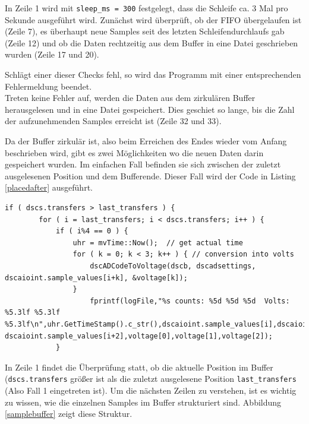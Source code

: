 \documentclass[12pt,a4paper]{scrartcl}
\begin{document}
In Zeile 1 wird mit \texttt{sleep\_ms = 300} festgelegt, dass die Schleife ca. 3 Mal pro Sekunde ausgeführt wird. Zunächst wird überprüft, ob der FIFO übergelaufen ist (Zeile 7), es überhaupt neue Samples seit des letzten Schleifendurchlaufs gab (Zeile 12) und ob die Daten rechtzeitig aus dem Buffer in eine Datei geschrieben wurden (Zeile 17 und 20). 

Schlägt einer dieser Checks fehl, so wird das Programm mit einer entsprechenden Fehlermeldung beendet.\\

Treten keine Fehler auf, werden die Daten aus dem zirkulären Buffer herausgelesen und in eine Datei gespeichert.
Dies geschiet so lange, bis die Zahl der aufzunehmenden Samples erreicht ist (Zeile 32 und 33).

Da der Buffer zirkulär ist, also beim Erreichen des Endes wieder vom Anfang beschrieben wird, gibt es zwei Möglichkeiten wo die neuen Daten darin gespeichert wurden. Im einfachen Fall befinden sie sich zwischen der zuletzt ausgelesenen Position und dem Bufferende. Dieser Fall wird der Code in Listing \ref{placedafter} ausgeführt. 

\begin{lstlisting}[frame=trBL]
	if ( dscs.transfers > last_transfers ) {
		for ( i = last_transfers; i < dscs.transfers; i++ ) {
			if ( i%4 == 0 ) {
				uhr = mvTime::Now();  // get actual time
				for ( k = 0; k < 3; k++ ) { // conversion into volts
					dscADCodeToVoltage(dscb, dscadsettings, dscaioint.sample_values[i+k], &voltage[k]);
				}
					fprintf(logFile,"%s counts: %5d %5d %5d  Volts: %5.3lf %5.3lf %5.3lf\n",uhr.GetTimeStamp().c_str(),dscaioint.sample_values[i],dscaioint.sample_values[i+1], dscaioint.sample_values[i+2],voltage[0],voltage[1],voltage[2]);
			}
\end{lstlisting}		

In Zeile 1 findet die Überprüfung statt, ob die aktuelle Position im Buffer (\texttt{dscs.transfers} größer ist als die zuletzt ausgelesene Position \texttt{last\_transfers} (Also Fall 1 eingetreten ist). 
Um die nächsten Zeilen zu verstehen, ist es wichtig zu wissen, wie die einzelnen Samples im Buffer strukturiert sind. Abbildung \ref{samplebuffer} zeigt diese Struktur. 
\end{document}
